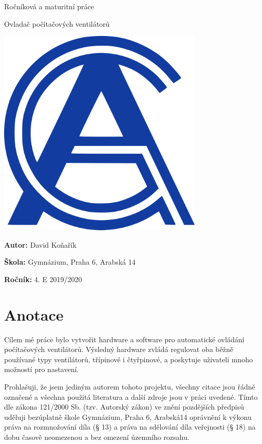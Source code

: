 \documentclass[a4paper]{report}
\begin{document}
\begin{titlepage}
	\vspace{9cm}
	{\centering\Huge Ročníková a maturitní práce \par}
	{\centering\huge Ovladač počítačových ventilátorů \par}

	\vspace{2cm}
	
	\begin{center}
	\includegraphics[height=10cm]{galogo.png}
	\end{center}

	\vfill

	{\large \textbf{Autor:} David Koňařík \par}
	{\large \textbf{Škola:} Gymnázium, Praha 6, Arabská 14 \par}
	{\large \textbf{Ročník:} 4. E 2019/2020 \par}
\end{titlepage}

\chapter*{Anotace}

Cílem mé práce bylo vytvořit hardware a software pro automatické ovládání
počítačových ventilátorů. Výsledný hardware zvládá regulovat oba běžně
používané typy ventilátorů, třípinové i čtyřpinové, a poskytuje uživateli mnoho
možností pro nastavení.

\vfill

Prohlašuji, že jsem jediným autorem tohoto projektu, všechny citace jsou řádně
označené a všechna použitá literatura a další zdroje jsou v práci uvedené.
Tímto dle zákona 121/2000 Sb. (tzv. Autorský zákon) ve znění pozdějších
předpisů uděluji bezúplatně škole Gymnázium, Praha 6, Arabská14 oprávnění k
výkonu práva na rozmnožování díla (§ 13) a práva na sdělování díla veřejnosti
(§ 18) na dobu časově neomezenou a bez omezení územního rozsahu.

\newpage

\tableofcontents
\newpage


\end{document}
